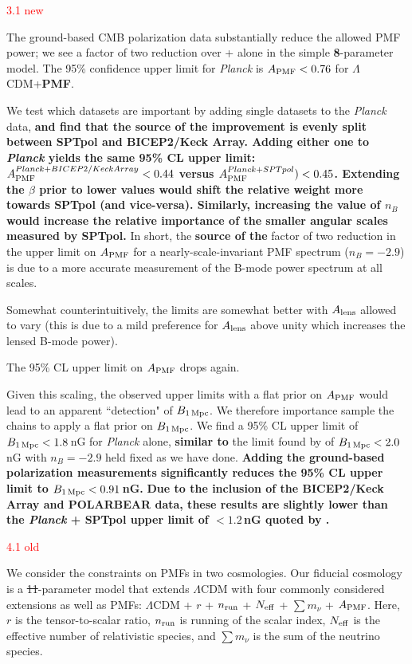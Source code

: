 \documentclass{article}
\newcommand{\apmf}{\ensuremath{A_{\rm PMF}}}
\newcommand{\bpmf}{\ensuremath{B_{\rm 1\,Mpc}}}
\newcommand{\alens}{\ensuremath{A_{\rm lens}}}
\newcommand{\lcdm}{\ensuremath{\Lambda}CDM}
\newcommand{\nrun}{\ensuremath{n_{\rm run}}}
\newcommand{\neff}{\ensuremath{N_{\rm eff}}}
\newcommand{\mnu}{\ensuremath{\sum m_\nu}}
\newcommand{\planck}{{\sl Planck}}
\newcommand{\bicepkeck}{BICEP2/Keck Array}
\newcommand{\sptpol}{SPTpol}
\newcommand{\changed}[1]{\textcolor{Red}{#1}}
\newcommand{\removed}[1]{\st{#1}}
\newcommand{\added}[1]{\textbf{#1}}
\begin{document}
\iffalse
\changed{3.1 new} 

The ground-based CMB polarization data  substantially reduce the allowed PMF power; we see a factor of two reduction over \plan+{} alone in the simple \added{8}-parameter model. 
The 95\% confidence upper limit for \planck{} is $\apmf <  \upperAplk$ for \lcdm{}+\added{PMF}. 

We test which datasets are important by adding single datasets to the \planck{} data, \added{and find that the source of the improvement is evenly split between \sptpol{} and \bicepkeck{}.
Adding either one to \planck{} yields the same 95\% CL upper limit: $\apmf^{\planck+\bicepkeck} <  \upperAbicep$ versus  $\apmf^{\planck+\sptpol}) < \upperAsptpol$. 
Extending the $\beta$ prior to lower values would shift the relative weight more towards \sptpol{} (and vice-versa). 
Similarly, increasing the value of $n_B$ would  increase the relative importance of the smaller angular scales measured by \sptpol.}
In short, the \added{source of the} factor of two reduction in the upper limit on \apmf{} for a nearly-scale-invariant PMF spectrum ($n_B=-2.9$) is due to a more accurate measurement of the B-mode power spectrum at all scales.

Somewhat counterintuitively, the limits are somewhat better with \alens{} allowed to vary (this is due to a mild preference for \alens{} above unity which increases the lensed B-mode power). 

The 95\% CL upper limit on \apmf{} drops again.

Given this scaling, the observed upper limits with a flat prior on \apmf{} would lead to an apparent ``detection" of \bpmf. 
We therefore importance sample the chains to apply a flat prior on \bpmf. 
We find a 95\% CL upper limit of $\bpmf < \upperBplk$\,nG for \planck{} alone,
\added{similar to} the limit found by \citet{planck15-19} of $\bpmf < 2.0$\,nG with $n_B=-2.9$ held fixed as we have done. 
\added{Adding the ground-based polarization measurements significantly reduces the 95\% CL upper limit to $\bpmf < \upperBall$\,nG. }
\added{Due to the inclusion of the \bicepkeck{} and POLARBEAR data, these results are slightly lower than the \planck{} + \sptpol{} upper limit of $<1.2\,$nG quoted by \citet{zucca16}.}

\changed{4.1 old}

We consider the constraints on PMFs in two cosmologies. 
Our fiducial cosmology is a \removed{11}-parameter model that extends \lcdm{} with  four  commonly considered extensions as well as PMFs:  \lcdm{} +  $r$ + \nrun{} +  \neff{} + \mnu{} + \apmf. 
Here, $r$ is the tensor-to-scalar ratio, \nrun{} is running of the scalar index, \neff{} is the effective number of relativistic species, and \mnu{} is the sum of the neutrino species. 
\end{document}

